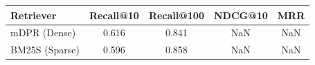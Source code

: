 \begin{tabular}{lcccc}
\toprule
Retriever & Recall@10 & Recall@100 & NDCG@10 & MRR \\
\midrule
mDPR (Dense) & 0.616 & 0.841 & NaN & NaN \\
BM25S (Sparse) & 0.596 & 0.858 & NaN & NaN \\
\bottomrule
\end{tabular}
